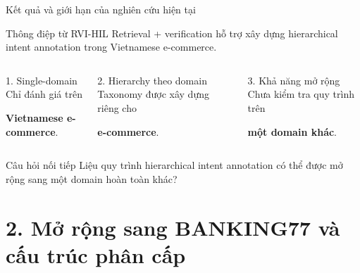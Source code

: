 \documentclass[10pt,aspectratio=169]{beamer}
\newcommand{\kw}[1]{\textcolor{uitblue}{\bfseries #1}}
\begin{document}
\begin{frame}{Kết quả và giới hạn của nghiên cứu hiện tại}
\small
\begin{greenbox}{Thông điệp từ RVI-HIL}
Retrieval + verification hỗ trợ xây dựng hierarchical intent annotation trong Vietnamese e-commerce.
\end{greenbox}
\vspace{0.28cm}
\begin{columns}[T,onlytextwidth]
\begin{uitbox}{1. Single-domain}
Chỉ đánh giá trên\par
\kw{Vietnamese e-commerce}.
\end{uitbox}
\begin{uitbox}{2. Hierarchy theo domain}
Taxonomy được xây dựng riêng cho\par
\kw{e-commerce}.
\end{uitbox}
\begin{uitbox}{3. Khả năng mở rộng}
Chưa kiểm tra quy trình trên\par
\kw{một domain khác}.
\end{uitbox}
\end{columns}
\vspace{0.32cm}
\begin{accentbox}{Câu hỏi nối tiếp}
\centering
\large Liệu quy trình hierarchical intent annotation có thể được mở rộng sang một domain hoàn toàn khác?
\end{accentbox}
\end{frame}

\section{2. Mở rộng sang BANKING77 và cấu trúc phân cấp}
\end{document}
